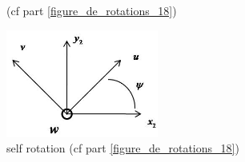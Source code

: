 \begin{figure}[h!]
\centering
{}
\caption{(cf part \ref{figure_de_rotations_18})}
\label{img_angles}
\end{figure}

\begin{figure}[h!]
\centering
\includegraphics[width=5cm]{graphe3.jpg}
\caption{self rotation (cf part \ref{figure_de_rotations_18})}
\label{decompgeo_rotationPropre}
\end{figure}





